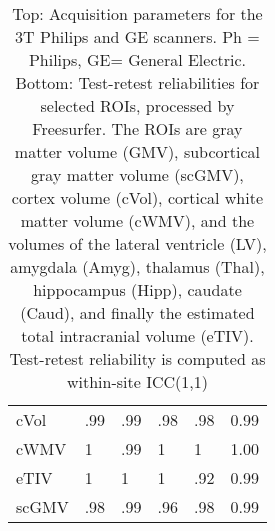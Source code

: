 \documentclass{article}
\begin{document}
\begin{table}
{\begin{tabular}{llllll}
cVol                  &                   .99 &                        .99 &                  .98 &               .98 &                 0.99 \\
cWMV                  &                   1 &                        .99 &                  1 &               1 &                 1.00 \\
eTIV                  &                   1 &                        1 &                  1 &               .92 &                 0.99 \\
scGMV                 &                   .98 &                        .99 &                  .96 &               .98 &                 0.99 \\
\bottomrule
\end{tabular}}
\fi
\caption{Top: Acquisition parameters for the 3T Philips and GE scanners. Ph = Philips, GE= General Electric. Bottom: Test-retest reliabilities for selected ROIs, processed by Freesurfer. The ROIs are gray matter volume (GMV), subcortical gray matter volume (scGMV), cortex volume (cVol), cortical white matter volume (cWMV), and the volumes of the lateral ventricle (LV), amygdala (Amyg), thalamus (Thal), hippocampus (Hipp), caudate (Caud), and finally the estimated total intracranial volume (eTIV). Test-retest reliability is computed as within-site ICC(1,1)} 
\label{tab:acquisition1}

\end{table}
\end{document}
